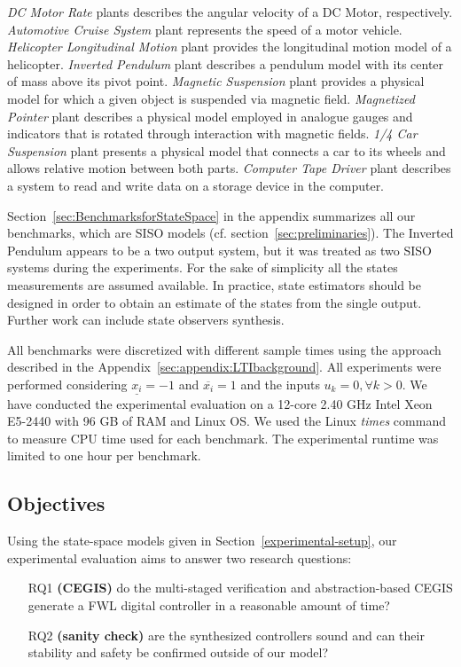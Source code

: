 \documentclass[runningheads,a4paper]{llncs}
\begin{document}
\textit{DC Motor Rate} plants describes the angular velocity of a DC Motor, respectively. 
\textit{Automotive Cruise System} plant represents the speed of a motor vehicle. 
\textit{Helicopter Longitudinal Motion} plant provides the longitudinal motion model 
of a helicopter. 
\textit{Inverted Pendulum} plant describes a pendulum model
with its center of mass above its pivot point. 
\textit{Magnetic Suspension} plant provides a physical model for which 
a given object is suspended via magnetic field. 
\textit{Magnetized Pointer} plant describes a physical model employed in analogue gauges 
and indicators that is rotated through interaction with magnetic fields.
\textit{1/4 Car Suspension} plant presents a physical model that connects a car to its wheels 
and allows relative motion between both parts.
\textit{Computer Tape Driver} plant describes a system to read and write data 
on a storage device in the computer.

Section~\ref{sec:BenchmarksforStateSpace} in the appendix summarizes 
all our benchmarks, which are SISO models (cf. section~\ref{sec:preliminaries}). 
The Inverted Pendulum appears to be a two output system, but it was treated as two 
SISO systems during the experiments. For the sake of simplicity all the states 
measurements are assumed available. In practice, state estimators should be designed 
in order to obtain an estimate of the states from the single output. 
Further work can include 
state observers synthesis.

All benchmarks were discretized with different sample times using 
the approach described in the Appendix~\ref{sec:appendix:LTIbackground}. 
All experiments were performed considering $\underline{x_{i}}=-1$ and 
$\overline{x_{i}}=1$ and the inputs $u_{k}=0, \forall k>0$.
We have conducted the experimental evaluation on a 12-core 2.40 GHz
Intel Xeon E5-2440 with 96 GB of RAM and Linux OS. We used the Linux \emph{times} command
to measure CPU time used for each benchmark. The experimental runtime was limited to
one hour per benchmark.
%

\subsection{Objectives}

Using the state-space models given in Section~\ref{experimental-setup}, 
our experimental evaluation aims to answer two research questions:
%
\begin{enumerate}

\item[RQ1] \textbf{(CEGIS)} do the multi-staged verification and abstraction-based
CEGIS generate a FWL digital controller in a reasonable amount of time?

\item[RQ2] \textbf{(sanity check)} are the synthesized controllers sound
and can their stability and safety be confirmed outside of our model?

\end{enumerate}
\end{document}
